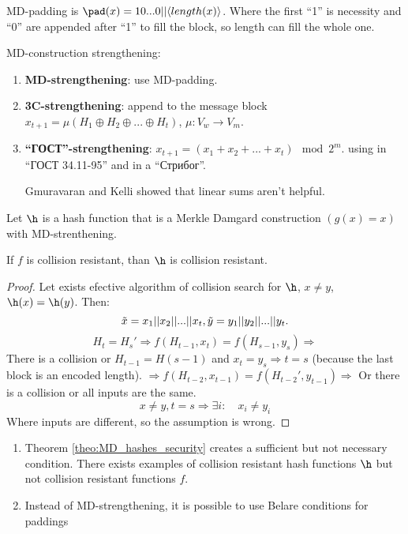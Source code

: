 \begin{definition}[MD-padding]
    MD-padding is $\pad(x) = 10...0||\langle length(x) \rangle$.
    Where the first ``1'' is necessity and ``0'' are appended after ``1'' to
    fill the block, so length can fill the whole one.
\end{definition}

MD-construction strengthening:
\begin{enumerate}[noitemsep]
    \item \textbf{MD-strengthening}: use MD-padding.
    \item \textbf{3C-strengthening}: append to the message block
        $x_{t+1} = \mu(H_1 \oplus H_2 \oplus ... \oplus H_t)$,
        $\mu: V_w \rightarrow V_m$.
    \item \textbf{``ГОСТ''-strengthening}: $x_{t+1} = (x_1 + x_2 + ... + x_t) \mod 2^m$.
        using in ``ГОСТ 34.11-95'' and in a ``Стрибог''.
        \begin{remark}[2007]
            Gmuravaran and Kelli showed that linear sums aren't helpful.
        \end{remark}
\end{enumerate}

\begin{theorem}\label{theo:MD_hashes_security}
    Let $\h$ is a hash function that is a Merkle Damgard construction
    $(g(x) = x)$ with MD-strenthening.

    If $f$ is collision resistant, than $\h$ is collision resistant.
\end{theorem}
\begin{proof}
    Let exists efective algorithm of collision search for $\h$, $x \neq y$,
    $\h(x) = \h(y)$. Then:
    $$\Tilde{x} = x_1 || x_2 || ... || x_t, \Tilde{y} = y_1 || y_2 || ... || y_t.$$
    $$H_t = H_s' \Rightarrow f(H_{t-1}, x_t) = f(H_{s-1}, y _s) \Rightarrow$$
    There is a collision  or $H_{t-1} = H(s-1)$ and $x_t = y_s \Rightarrow t = s$
    (because the last block is an encoded length).
    $\Rightarrow f(H_{t-2}, x_{t-1}) = f(H_{t-2}', y_{t-1}) \Rightarrow$
    Or there is a collision or all inputs are the same.
    $$x \neq y, t = s \Rightarrow \exists i: \quad x_i \neq y_i$$
    Where inputs are different, so the assumption is wrong.
\end{proof}

\begin{remark}
    \begin{enumerate}
        \item Theorem \ref{theo:MD_hashes_security} creates a sufficient but not
            necessary condition. There exists examples of collision resistant
            hash functions $\h$ but not collision resistant functions $f$.
        \item Instead of MD-strengthening, it is possible to use Belare conditions
            for paddings
    \end{enumerate}
\end{remark}

